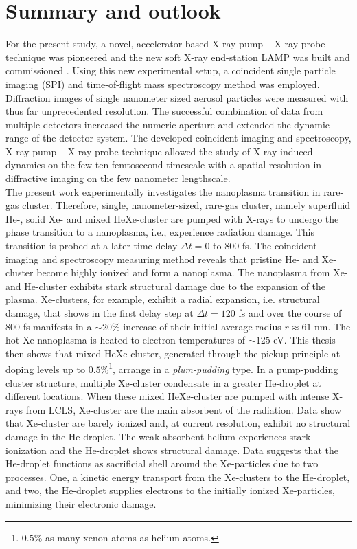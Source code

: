 \chapter{Summary and outlook}\label{ch:summary_outlook}
For the present study, a novel, accelerator based X-ray pump -- X-ray probe technique was pioneered \citep{Lutman-2013-PRL} and the new soft X-ray end-station LAMP was built and commissioned \citep{Ferguson-2015-JSR}. Using this new experimental setup, a coincident single particle imaging (SPI) and time-of-flight mass spectroscopy method was employed. Diffraction images of single nanometer sized aerosol particles were measured with thus far unprecedented resolution. The successful combination of data from multiple detectors increased the numeric aperture and extended the dynamic range of the detector system. The developed coincident imaging and spectroscopy, X-ray pump -- X-ray probe technique allowed the study of X-ray induced dynamics on the few ten femtosecond timescale with a spatial resolution in diffractive imaging on the few nanometer lengthscale.\\
%
The present work experimentally investigates the nanoplasma transition in rare-gas cluster. Therefore, single, nanometer-sized, rare-gas cluster, namely superfluid He-, solid Xe- and mixed HeXe-cluster are pumped with X-rays to undergo the phase transition to a nanoplasma, i.e., experience radiation damage. This transition is probed at a later time delay $\Delta t=0$ to $800$ fs. The coincident imaging and spectroscopy measuring method reveals that pristine He- and Xe-cluster become highly ionized and form a nanoplasma. The nanoplasma from Xe- and He-cluster exhibits stark structural damage due to the expansion of the plasma. Xe-clusters, for example, exhibit a radial expansion, i.e. structural damage, that shows in the first delay step at $\Delta t = 120$ fs and over the course of 800 fs manifests in a $\sim 20 \%$ increase of their initial average radius $r\approx 61$ nm. The hot Xe-nanoplasma is heated to electron temperatures of $\sim 125$ eV. This thesis then shows that mixed HeXe-cluster, generated through the pickup-principle at doping levels up to $0.5\%$\footnote{$0.5\%$ as many xenon atoms as helium atoms.}, arrange in a \textit{plum-pudding} type. In a pump-pudding cluster structure, multiple Xe-cluster condensate in a greater He-droplet at different locations. When these mixed HeXe-cluster are pumped with intense X-rays from LCLS, Xe-cluster are the main absorbent of the radiation. Data show that Xe-cluster are barely ionized and, at current resolution, exhibit no structural damage in the He-droplet. The weak absorbent helium experiences stark ionization and the He-droplet shows structural damage. Data suggests that the He-droplet functions as sacrificial shell around the Xe-particles due to two processes. One, a kinetic energy transport from the Xe-clusters to the He-droplet, and two, the He-droplet supplies electrons to the initially ionized Xe-particles, minimizing their electronic damage.\\
